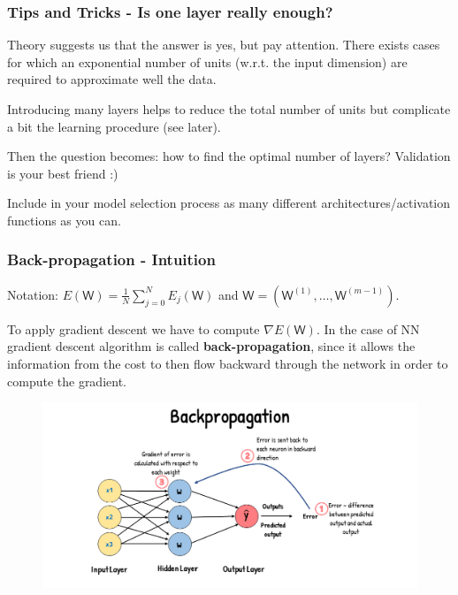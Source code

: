 \documentclass{beamer}
\begin{document}
	\begin{frame}
		\frametitle{Tips and Tricks - Is one layer really enough?}
		Theory suggests us that the answer is yes, but pay attention. There exists cases for which an exponential number of units (w.r.t. the input dimension) are required to approximate well the data.
		
		\vspace{5mm}
		
		Introducing many layers helps to reduce the total number of units but complicate a bit the learning procedure (see later).
		
		\vspace{5mm}
		
		Then the question becomes: how to find the optimal number of layers? Validation is your best friend :)
		
		Include in your model selection process as many different architectures/activation functions as you can.
	\end{frame}

	\begin{frame}
		\frametitle{Back-propagation - Intuition}
		Notation: $E(\mathsf{W}) = \frac{1}{N} \sum_{j=0}^{N} E_j(\mathsf{W})$ and  $\mathsf{W} = (\mathsf{W}^{(1)}, \dots, \mathsf{W}^{(m-1)})$.
		
		\vspace{5mm}
		
		To apply gradient descent we have to compute $\nabla E(\mathsf{W})$. In the case of NN gradient descent algorithm is called \textbf{back-propagation}, since it allows the information from the cost to then ﬂow backward through the network in order to compute the gradient.
		\begin{figure}
			\centering
			\includegraphics[scale=0.35]{images/backprop}
		\end{figure}
	\end{frame}
\end{document}
